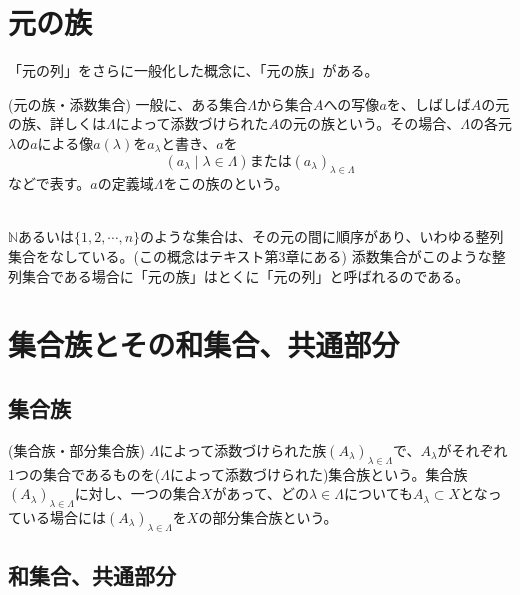 \documentclass[a4j]{jsarticle}
\begin{document}
\section{元の族}

「元の列」をさらに一般化した概念に、「元の族」がある。\\

\begin{itembox}[l]{ (元の族・添数集合)}
	一般に、ある集合$\Lambda$から集合$A$への写像$a$を、しばしば$A$の元の族、詳しくは$\Lambda$によって添数づけられた$A$の元の族という。その場合、$\Lambda$の各元$\lambda$の$a$による像$a(\lambda)$を$a_\lambda$と書き、$a$を$$ (a_\lambda \mid \lambda \in \Lambda) または (a_\lambda)_{\lambda \in \Lambda} $$などで表す。$a$の定義域$\Lambda$をこの族のという。
\end{itembox}\\

 $\mathbb{N}$あるいは$\{1,2,\cdots,n\}$のような集合は、その元の間に順序があり、いわゆる整列集合をなしている。(この概念はテキスト\cite{text}第3章にある) 添数集合がこのような整列集合である場合に「元の族」はとくに「元の列」と呼ばれるのである。

\section{集合族とその和集合、共通部分}

\subsection{集合族}

\begin{itembox}[l]{ (集合族・部分集合族)}
	$\Lambda$によって添数づけられた族$(A_\lambda)_{\lambda \in \Lambda}$で、$A_\lambda$がそれぞれ1つの集合であるものを($\Lambda$によって添数づけられた)集合族という。集合族$(A_\lambda)_{\lambda \in \Lambda}$に対し、一つの集合$X$があって、どの$\lambda \in \Lambda$についても$A_\lambda \subset X$となっている場合には$(A_\lambda)_{\lambda \in \Lambda}$を$X$の部分集合族という。
\end{itembox}

\subsection{和集合、共通部分}
\end{document}
